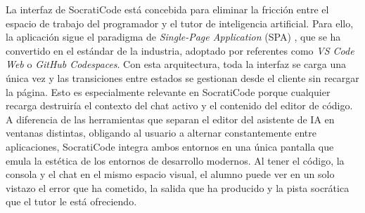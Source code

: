 La interfaz de SocratiCode está concebida para eliminar la fricción entre el espacio de trabajo del programador y el tutor de inteligencia artificial. Para ello, la aplicación sigue el paradigma de \textit{Single-Page Application} (SPA) \cite{mikowski2013single}, que se ha convertido en el estándar de la industria, adoptado por referentes como \textit{VS Code Web} o \textit{GitHub Codespaces}. Con esta arquitectura, toda la interfaz se carga una única vez y las transiciones entre estados se gestionan desde el cliente sin recargar la página. Esto es especialmente relevante en SocratiCode porque cualquier recarga destruiría el contexto del chat activo y el contenido del editor de código. A diferencia de las herramientas que separan el editor del asistente de IA en ventanas distintas, obligando al usuario a alternar constantemente entre aplicaciones, SocratiCode integra ambos entornos en una única pantalla que emula la estética de los entornos de desarrollo modernos. Al tener el código, la consola y el chat en el mismo espacio visual, el alumno puede ver en un solo vistazo el error que ha cometido, la salida que ha producido y la pista socrática que el tutor le está ofreciendo.